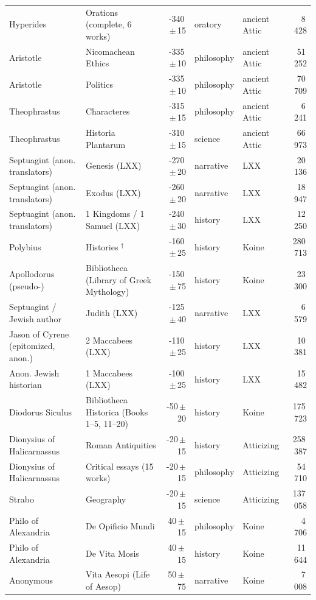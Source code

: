\begin{longtable}{p{2.6cm}p{4.1cm}rll r}
Hyperides & Orations (complete, 6 works) & -340\,$\pm$\,15 & oratory & ancient Attic & 8\,428 \\
Aristotle & Nicomachean Ethics & -335\,$\pm$\,10 & philosophy & ancient Attic & 51\,252 \\
Aristotle & Politics & -335\,$\pm$\,10 & philosophy & ancient Attic & 70\,709 \\
Theophrastus & Characteres & -315\,$\pm$\,15 & philosophy & ancient Attic & 6\,241 \\
Theophrastus & Historia Plantarum & -310\,$\pm$\,15 & science & ancient Attic & 66\,973 \\
Septuagint (anon. translators) & Genesis (LXX) & -270\,$\pm$\,20 & narrative & LXX & 20\,136 \\
Septuagint (anon. translators) & Exodus (LXX) & -260\,$\pm$\,20 & narrative & LXX & 18\,947 \\
Septuagint (anon. translators) & 1 Kingdoms / 1 Samuel (LXX) & -240\,$\pm$\,30 & history & LXX & 12\,250 \\
Polybius & Histories $^{\dagger}$ & -160\,$\pm$\,25 & history & Koine & 280\,713 \\
Apollodorus (pseudo-) & Bibliotheca (Library of Greek Mythology) & -150\,$\pm$\,75 & history & Koine & 23\,300 \\
Septuagint / Jewish author & Judith (LXX) & -125\,$\pm$\,40 & narrative & LXX & 6\,579 \\
Jason of Cyrene (epitomized, anon.) & 2 Maccabees (LXX) & -110\,$\pm$\,25 & history & LXX & 10\,381 \\
Anon. Jewish historian & 1 Maccabees (LXX) & -100\,$\pm$\,25 & history & LXX & 15\,482 \\
Diodorus Siculus & Bibliotheca Historica (Books 1–5, 11–20) & -50\,$\pm$\,20 & history & Koine & 175\,723 \\
Dionysius of Halicarnassus & Roman Antiquities & -20\,$\pm$\,15 & history & Atticizing & 258\,387 \\
Dionysius of Halicarnassus & Critical essays (15 works) & -20\,$\pm$\,15 & philosophy & Atticizing & 54\,710 \\
Strabo & Geography & -20\,$\pm$\,15 & science & Atticizing & 137\,058 \\
Philo of Alexandria & De Opificio Mundi & 40\,$\pm$\,15 & philosophy & Koine & 4\,706 \\
Philo of Alexandria & De Vita Mosis & 40\,$\pm$\,15 & history & Koine & 11\,644 \\
Anonymous & Vita Aesopi (Life of Aesop) & 50\,$\pm$\,75 & narrative & Koine & 7\,008 \\

\end{longtable}
